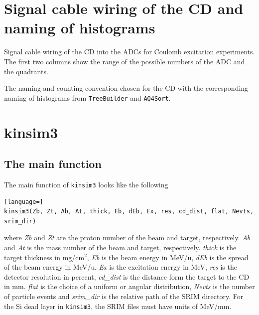 \documentclass[twoside,english]{uiofysmaster/uiofysmaster}
\begin{document}
\begin{appendices}



\chapter{Signal cable wiring of the CD and naming of histograms}\label{a:signal}

\begin{table}[ht] 
	\centering 
	\caption{Signal cable wiring of the CD into the ADCs for Coulomb excitation experiments.
	The first two columns show the range of the possible numbers of the ADC and the quadrants.}
	
	\label{tab:ADC}
\end{table}


\begin{table}[ht] 
	\centering 
	\caption{The naming and counting convention chosen for the CD with the corresponding naming of histograms from \texttt{TreeBuilder} and \texttt{AQ4Sort}.}
	
	\label{tab:TBvsAQ4}
\end{table}




\chapter{kinsim3}\label{ch:cd_sim}

\section{The main function}
The main function of \texttt{kinsim3} looks like the following
\begin{lstlisting}[language=]
kinsim3(Zb, Zt, Ab, At, thick, Eb, dEb, Ex, res, cd_dist, flat, Nevts, srim_dir)
\end{lstlisting}
where \textit{Zb} and \textit{Zt} are the proton number of the beam and target, respectively. 
\textit{Ab} and \textit{At} is the mass number of the beam and target, respectively. 
\textit{thick} is the target thickness in mg/cm$^2$, \textit{Eb} is the beam energy in MeV/u, \textit{dEb} is the spread of the beam energy in MeV/u. 
\textit{Ex} is the excitation energy in MeV, \textit{res} is the detector resolution in percent, \textit{cd\_dist} is the distance form the target to the CD in mm. 
\textit{flat} is the choice of a uniform or angular distribution, \textit{Nevts} is the number of particle events and \textit{srim\_dir} is the relative path of the SRIM directory.
For the Si dead layer in \texttt{kinsim3}, the SRIM files must have units of MeV/mm. 


\end{appendices}
\end{document}
